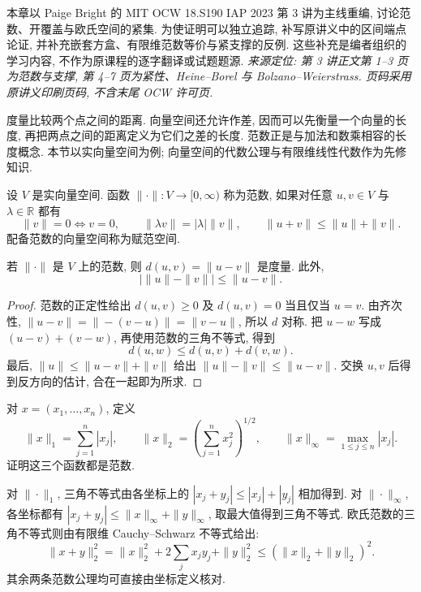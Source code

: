 \label{ch:eucompact}

本章以 Paige Bright 的 MIT OCW 18.S190 IAP 2023 第 3 讲为主线重编, 讨论范数、开覆盖与欧氏空间的紧集. 为使证明可以独立追踪, 补写原讲义中的区间端点论证, 并补充嵌套方盒、有限维范数等价与紧支撑的反例. 这些补充是编者组织的学习内容, 不作为原课程的逐字翻译或试题题源.
\emph{来源定位: 第 3 讲正文第 1--3 页为范数与支撑, 第 4--7 页为紧性、Heine--Borel 与 Bolzano--Weierstrass. 页码采用原讲义印刷页码, 不含末尾 OCW 许可页.}

\label{ch:eucompact:norms}

度量比较两个点之间的距离. 向量空间还允许作差, 因而可以先衡量一个向量的长度, 再把两点之间的距离定义为它们之差的长度. 范数正是与加法和数乘相容的长度概念. 本节以实向量空间为例; 向量空间的代数公理与有限维线性代数作为先修知识.

\begin{definition}[范数]
设 $V$ 是实向量空间. 函数 $\|\cdot\|:V\to[0,\infty)$ 称为范数, 如果对任意 $u,v\in V$ 与 $\lambda\in\mathbb{R}$ 都有
\[
 \|v\|=0\Longleftrightarrow v=0,\qquad
 \|\lambda v\|=|\lambda|\|v\|,\qquad
 \|u+v\|\leq\|u\|+\|v\|.
\]
配备范数的向量空间称为赋范空间.
\end{definition}

\begin{proposition}[范数诱导的度量]
若 $\|\cdot\|$ 是 $V$ 上的范数, 则 $d(u,v)=\|u-v\|$ 是度量. 此外,
\[
 \bigl|\|u\|-\|v\|\bigr|\leq\|u-v\|.
\]
\end{proposition}
\begin{proof}
范数的正定性给出 $d(u,v)\geq0$ 及 $d(u,v)=0$ 当且仅当 $u=v$. 由齐次性,
$\|u-v\|=\|-(v-u)\|=\|v-u\|$, 所以 $d$ 对称. 把 $u-w$ 写成 $(u-v)+(v-w)$, 再使用范数的三角不等式, 得到
\[
 d(u,w)\leq d(u,v)+d(v,w).
\]
最后, $\|u\|\leq\|u-v\|+\|v\|$ 给出 $\|u\|-\|v\|\leq\|u-v\|$. 交换 $u,v$ 后得到反方向的估计, 合在一起即为所求.
\end{proof}

\begin{example}
对 $x=(x_1,\ldots,x_n)$, 定义
\[
 \|x\|_1=\sum_{j=1}^n|x_j|,\qquad
 \|x\|_2=\left(\sum_{j=1}^n x_j^2\right)^{1/2},\qquad
 \|x\|_\infty=\max_{1\leq j\leq n}|x_j|.
\]
证明这三个函数都是范数.
\end{example}
\begin{solution}
对 $\|\cdot\|_1$, 三角不等式由各坐标上的 $|x_j+y_j|\leq|x_j|+|y_j|$ 相加得到. 对 $\|\cdot\|_\infty$, 各坐标都有 $|x_j+y_j|\leq\|x\|_\infty+\|y\|_\infty$, 取最大值得到三角不等式. 欧氏范数的三角不等式则由有限维 Cauchy--Schwarz 不等式给出:
\[
 \|x+y\|_2^2
 =\|x\|_2^2+2\sum_j x_jy_j+\|y\|_2^2
 \leq(\|x\|_2+\|y\|_2)^2.
\]
其余两条范数公理均可直接由坐标定义核对.
\end{solution}

